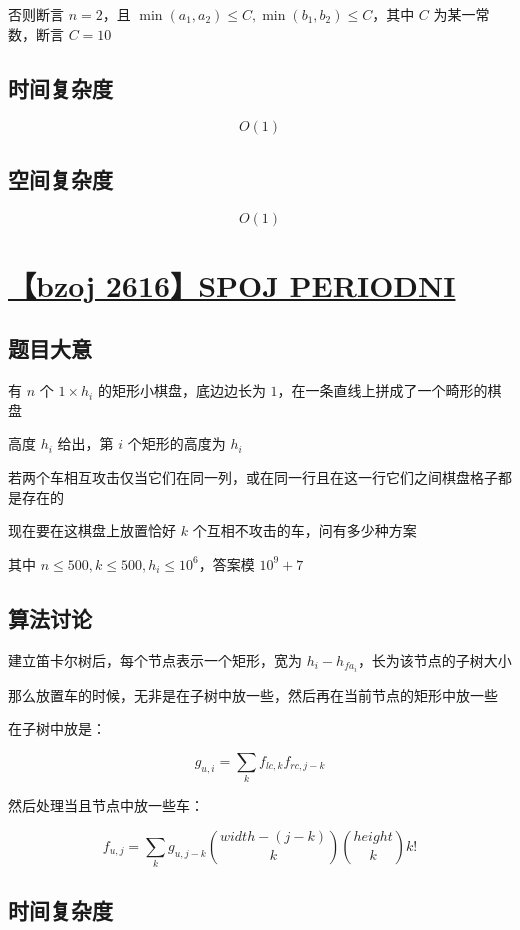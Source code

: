 \documentclass[UTF8]{article}
\begin{document}
否则断言 $n=2$，且 $\min(a_1,a_2) \le C,\min(b_1,b_2) \le C$，其中 $C$ 为某一常数，断言 $C=10$

\subsection{时间复杂度}

$$
O(1)
$$

\subsection{空间复杂度}

$$
O(1)
$$

\section{\href{https://www.lydsy.com/JudgeOnline/problem.php?id=2616}{【bzoj 2616】SPOJ PERIODNI}}

\subsection{题目大意}

有 $n$ 个 $1 \times h_i$ 的矩形小棋盘，底边边长为 $1$，在一条直线上拼成了一个畸形的棋盘

高度 $h_i$ 给出，第 $i$ 个矩形的高度为 $h_i$

若两个车相互攻击仅当它们在同一列，或在同一行且在这一行它们之间棋盘格子都是存在的

现在要在这棋盘上放置恰好 $k$ 个互相不攻击的车，问有多少种方案

其中 $n \le 500,k \le 500,h_i \le 10^6$，答案模 $10^9+7$

\subsection{算法讨论}

建立笛卡尔树后，每个节点表示一个矩形，宽为 $h_i-h_{fa_i}$，长为该节点的子树大小

那么放置车的时候，无非是在子树中放一些，然后再在当前节点的矩形中放一些

在子树中放是：

$$
g_{u,i}=\sum_{k}f_{lc,k} f_{rc,j-k}
$$

然后处理当且节点中放一些车：

$$
f_{u,j}=\sum_{k} g_{u,j-k} {width-(j-k) \choose k} {height \choose k}k!
$$

\subsection{时间复杂度}
\end{document}
